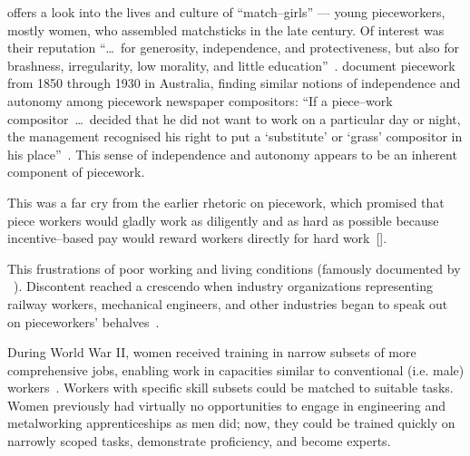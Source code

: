 \documentclass[trackingWork]{subfiles}
\begin{document}
\citeauthor{10.2307/3827491} offers a look into the lives and culture of ``match--girls''
--- young pieceworkers, mostly women, who assembled matchsticks in the late  century.
Of interest was their reputation ``\dots~for generosity, independence, and protectiveness,
but also for brashness, irregularity, low morality, and little education''~\cite{10.2307/3827491}.
\citeauthor{10.2307/27508091} document piecework from 1850 through 1930 in Australia,
finding similar notions of independence and autonomy among piecework newspaper compositors:
``If a piece--work compositor~\dots~decided that he did not want to work on a particular day or night,
the management recognised his right to put a `substitute' or `grass' compositor in his place''~\cite{10.2307/27508091}.
This sense of independence and autonomy appears to be an inherent component of piecework.

This was a far cry from the earlier rhetoric on piecework, which promised that
piece workers would gladly work as diligently and as hard as possible because
incentive--based pay would reward workers directly for hard work~[].

This frustrations of poor working and living conditions
(famously documented by
\citeauthor{riisOtherSideLives}~\cite{riisOtherSideLives}).
Discontent reached a crescendo when industry organizations representing
railway workers, mechanical engineers, and other industries began to speak out on pieceworkers' behalves~\cite{american1921problem,richards1904anything}.


During World War II, women received training in narrow subsets of more comprehensive jobs, enabling work in capacities similar to conventional (i.e. male) workers~\cite{hart2013rise}.
Workers with specific skill subsets could be matched to suitable tasks.
Women previously had virtually no opportunities
to engage in engineering and metalworking apprenticeships as men did;
now, they
could be trained quickly on narrowly scoped tasks,
demonstrate proficiency, and become experts.
\end{document}
